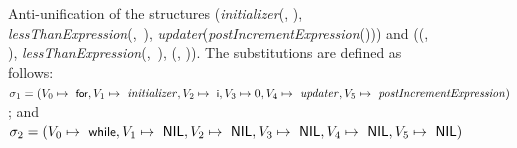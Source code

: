 \begin{figure}[!h]
\centering{}
\caption[Complex anti-unification of two structures demonstrating a \protect\NIL{}-theory.]{Anti-unification of the structures (\textit{initializer}(, ), \mbox{\textit{lessThanExpression}(, ),} \textit{updater}(\textit{postIncrementExpression}())) and (\NIL{}(\NIL{}, \NIL{}), \mbox{\textit{lessThanExpression}(, ),} \NIL{}(\NIL{}, \NIL{})). The substitutions are defined as follows: $\sigma_1 = (V_0 \mapsto \text{ \textsf{\small for}}, V_1 \mapsto \text{ \textit{initializer}}, V_2 \mapsto \text{ \textsf{\small i}}, V_3 \mapsto 0, V_4 \mapsto \text{ \textit{updater}}, V_5 \mapsto \text{ \textit{postIncrementExpression}})$; and $\sigma_2 = (V_0 \mapsto \text{ \textsf{\small while}}, V_1 \mapsto \text{ \textsf{NIL}}, V_2 \mapsto \text{ \textsf{NIL}}, V_3 \mapsto \text{ \textsf{NIL}}, V_4 \mapsto \text{ \textsf{NIL}}, V_5 \mapsto \text{ \textsf{NIL}})$\label{fig:for-while}}
\end{figure}


